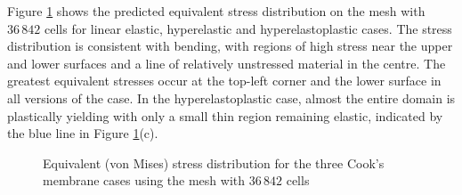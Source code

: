 \documentclass[sn-mathphys,Numbered]{sn-jnl}%
\begin{document}
Figure \ref{fig:cooksMembrane_sigmaEq} shows the predicted equivalent stress distribution on the mesh with $36\,842$ cells for linear elastic, hyperelastic and hyperelastoplastic cases.
The stress distribution is consistent with bending, with regions of high stress near the upper and lower surfaces and a line of relatively unstressed material in the centre.
The greatest equivalent stresses occur at the top-left corner and the lower surface in all versions of the case.
In the hyperelastoplastic case, almost the entire domain is plastically yielding with only a small thin region remaining elastic, indicated by the blue line in Figure \ref{fig:cooksMembrane_sigmaEq}(c).
\begin{figure}[htbp]
   \centering
   \caption{Equivalent (von Mises) stress distribution for the three Cook's membrane cases using the mesh with $36\,842$ cells}
   \label{fig:cooksMembrane_sigmaEq}
\end{figure}
\end{document}
